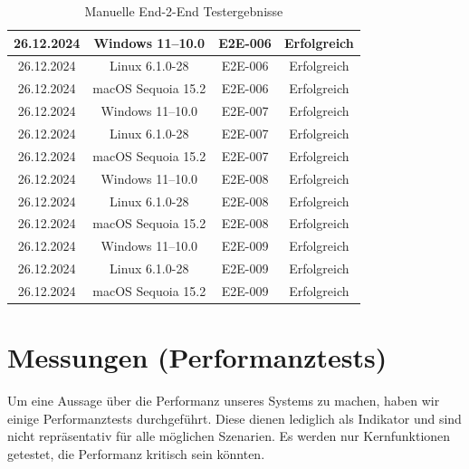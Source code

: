 \documentclass[a4paper,12pt]{report}
\begin{document}
\begin{table}[h!]
\begin{tabular}{|c|c|c|c|}
            26.12.2024     & Windows 11--10.0        & E2E-006           & Erfolgreich       \\ \hline
            26.12.2024     & Linux 6.1.0-28          & E2E-006           & Erfolgreich       \\ \hline
            26.12.2024     & macOS Sequoia 15.2      & E2E-006           & Erfolgreich       \\ \hline
            26.12.2024     & Windows 11--10.0        & E2E-007           & Erfolgreich       \\ \hline
            26.12.2024     & Linux 6.1.0-28          & E2E-007           & Erfolgreich       \\ \hline
            26.12.2024     & macOS Sequoia 15.2      & E2E-007           & Erfolgreich       \\ \hline
            26.12.2024     & Windows 11--10.0        & E2E-008           & Erfolgreich       \\ \hline
            26.12.2024     & Linux 6.1.0-28          & E2E-008           & Erfolgreich       \\ \hline
            26.12.2024     & macOS Sequoia 15.2      & E2E-008           & Erfolgreich       \\ \hline
            26.12.2024     & Windows 11--10.0        & E2E-009           & Erfolgreich       \\ \hline
            26.12.2024     & Linux 6.1.0-28          & E2E-009           & Erfolgreich       \\ \hline
            26.12.2024     & macOS Sequoia 15.2      & E2E-009           & Erfolgreich       \\ \hline

        \end{tabular}
        \caption{Manuelle End-2-End Testergebnisse}\label{tab:e2e-results}
    \end{table}


    \clearpage


    \section{Messungen (Performanztests)}\label{sec:performanztests}
    Um eine Aussage über die Performanz unseres Systems zu machen, haben wir einige Performanztests durchgeführt.
    Diese dienen lediglich als Indikator und sind nicht repräsentativ für alle möglichen Szenarien.
    Es werden nur Kernfunktionen getestet, die Performanz kritisch sein könnten.
\end{document}
